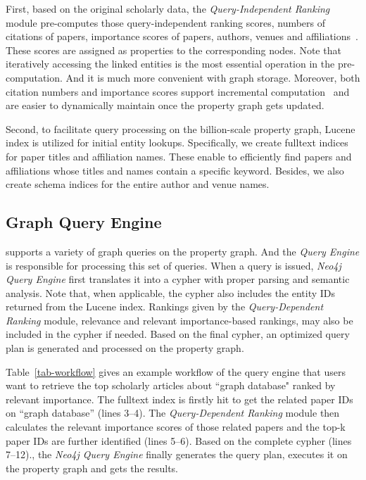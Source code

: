 First, based on the original scholarly data, the {\em Query-Independent Ranking} module pre-computes those query-independent ranking scores, \ie numbers of citations of papers, importance scores of papers, authors, venues and affiliations~\cite{ma2018query}. These scores are assigned as properties to the corresponding nodes.
Note that iteratively accessing the linked entities is the most essential operation in the pre-computation. And it is much more convenient with graph storage.
Moreover, both citation numbers and importance scores support incremental computation~\cite{ma2018query} and are easier to dynamically maintain once the property graph gets updated.


Second, to facilitate query processing on the billion-scale property graph, Lucene index is utilized for initial entity lookups. Specifically, we create fulltext indices for paper titles and affiliation names. These enable to efficiently find papers and affiliations whose titles and names contain a specific keyword. Besides, we also create schema indices for the entire author and venue names. %



\subsection{Graph Query Engine} \label{subsec:qe}
\oursystem supports a variety of graph queries on the property graph. And the {\em Query Engine} is responsible for processing this set of queries. When a query is issued, {\em Neo4j Query Engine} first translates it into a cypher with proper parsing and semantic analysis.
Note that, when applicable, the cypher also includes the entity IDs returned from the Lucene index. Rankings given by the {\em Query-Dependent Ranking} module, \ie relevance and relevant importance-based rankings, may also be included in the cypher if needed. Based on the final cypher, an optimized query plan is generated and processed on the property graph.


Table~\ref{tab-workflow} gives an example workflow of the query engine that users want to retrieve the top scholarly articles about ``graph database"  ranked by relevant importance. The fulltext index is firstly hit to get the related paper IDs on ``graph database'' (lines 3--4). The {\em Query-Dependent Ranking} module then calculates the relevant importance scores of those related papers and the top-k paper IDs are further identified (lines 5--6). Based on the complete cypher (lines 7--12)., the {\em Neo4j Query Engine} finally generates the query plan, executes it on the property graph and gets the results.

